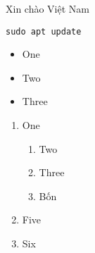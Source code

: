\documentclass{article}
\begin{document}
Xin chào Việt Nam
\begin{lstlisting}
sudo apt update
\end{lstlisting}

\begin{itemize}
	\item One
	\item Two
	\item Three
\end{itemize}

\begin{enumerate}
	\item One
		\begin{enumerate}
			\item Two
			\item Three
			\item Bốn
		\end{enumerate}
	\item Five
	\item Six
\end{enumerate}
\end{document}
